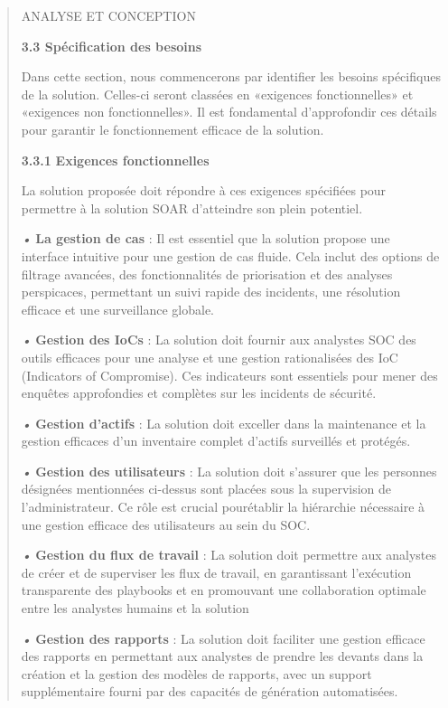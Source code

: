 \documentclass[
]{article}
\begin{document}
\begin{quote}
ANALYSE ET CONCEPTION

\textbf{3.3 Spécification des besoins}

Dans cette section, nous commencerons par identifier les besoins
spécifiques de la solution. Celles-ci seront classées en «exigences
fonctionnelles» et «exigences non fonctionnelles». Il est fondamental
d'approfondir ces détails pour garantir le fonctionnement efficace de la
solution.

\textbf{3.3.1} \textbf{Exigences fonctionnelles}

La solution proposée doit répondre à ces exigences spécifiées pour
permettre à la solution SOAR d'atteindre son plein potentiel.

\emph{•} \textbf{La gestion de cas} : Il est essentiel que la solution
propose une interface intuitive pour une gestion de cas fluide. Cela
inclut des options de filtrage avancées, des fonctionnalités de
priorisation et des analyses perspicaces, permettant un suivi rapide des
incidents, une résolution efficace et une surveillance globale.

\emph{•} \textbf{Gestion des IoCs} : La solution doit fournir aux
analystes SOC des outils efficaces pour une analyse et une gestion
rationalisées des IoC (Indicators of Compromise). Ces indicateurs sont
essentiels pour mener des enquêtes approfondies et complètes sur les
incidents de sécurité.

\emph{•} \textbf{Gestion d'actifs} : La solution doit exceller dans la
maintenance et la gestion efficaces d'un inventaire complet d'actifs
surveillés et protégés.

\emph{•} \textbf{Gestion des utilisateurs} : La solution doit s'assurer
que les personnes désignées mentionnées ci-dessus sont placées sous la
supervision de l'administrateur. Ce rôle est crucial pourétablir la
hiérarchie nécessaire à une gestion efficace des utilisateurs au sein du
SOC.

\emph{•} \textbf{Gestion du flux de travail} : La solution doit
permettre aux analystes de créer et de superviser les flux de travail,
en garantissant l'exécution transparente des playbooks et en promouvant
une collaboration optimale entre les analystes humains et la solution

\emph{•} \textbf{Gestion des rapports} : La solution doit faciliter une
gestion efficace des rapports en permettant aux analystes de prendre les
devants dans la création et la gestion des modèles de rapports, avec un
support supplémentaire fourni par des capacités de génération
automatisées.
\end{quote}
\end{document}
